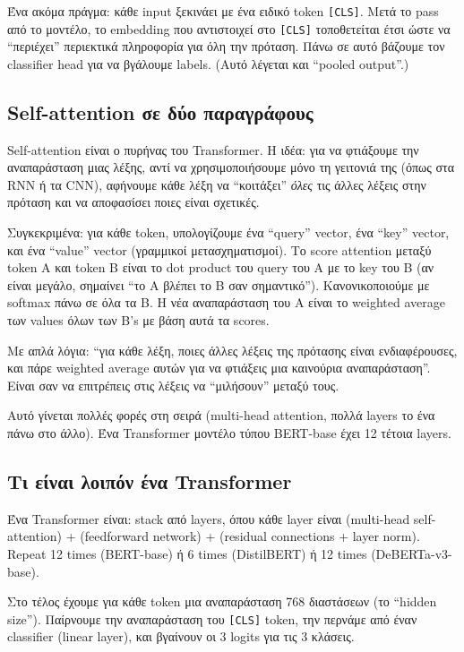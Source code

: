 \documentclass[12pt]{fphw}
\begin{document}
Ένα ακόμα πράγμα: κάθε input ξεκινάει με ένα ειδικό token \texttt{[CLS]}. Μετά το pass από το μοντέλο, το embedding που αντιστοιχεί στο \texttt{[CLS]} τοποθετείται έτσι ώστε να ``περιέχει'' περιεκτικά πληροφορία για όλη την πρόταση. Πάνω σε αυτό βάζουμε τον classifier head για να βγάλουμε labels. (Αυτό λέγεται και ``pooled output''.)

\subsection{Self-attention σε δύο παραγράφους}

Self-attention είναι ο πυρήνας του Transformer. Η ιδέα: για να φτιάξουμε την αναπαράσταση μιας λέξης, αντί να χρησιμοποιήσουμε μόνο τη γειτονιά της (όπως στα RNN ή τα CNN), αφήνουμε κάθε λέξη να ``κοιτάξει'' \emph{όλες} τις άλλες λέξεις στην πρόταση και να αποφασίσει ποιες είναι σχετικές.

Συγκεκριμένα: για κάθε token, υπολογίζουμε ένα ``query'' vector, ένα ``key'' vector, και ένα ``value'' vector (γραμμικοί μετασχηματισμοί). Το score attention μεταξύ token A και token B είναι το dot product του query του A με το key του B (αν είναι μεγάλο, σημαίνει ``το A βλέπει το B σαν σημαντικό''). Κανονικοποιούμε με softmax πάνω σε όλα τα Β. Η νέα αναπαράσταση του A είναι το weighted average των values όλων των B's με βάση αυτά τα scores.

Με απλά λόγια: ``για κάθε λέξη, ποιες άλλες λέξεις της πρότασης είναι ενδιαφέρουσες, και πάρε weighted average αυτών για να φτιάξεις μια καινούρια αναπαράσταση''. Είναι σαν να επιτρέπεις στις λέξεις να ``μιλήσουν'' μεταξύ τους.

Αυτό γίνεται πολλές φορές στη σειρά (multi-head attention, πολλά layers το ένα πάνω στο άλλο). Ένα Transformer μοντέλο τύπου BERT-base έχει 12 τέτοια layers.

\subsection{Τι είναι λοιπόν ένα Transformer}

Ένα Transformer είναι: stack από layers, όπου κάθε layer είναι (multi-head self-attention) + (feedforward network) + (residual connections + layer norm). Repeat 12 times (BERT-base) ή 6 times (DistilBERT) ή 12 times (DeBERTa-v3-base).

Στο τέλος έχουμε για κάθε token μια αναπαράσταση 768 διαστάσεων (το ``hidden size''). Παίρνουμε την αναπαράσταση του \texttt{[CLS]} token, την περνάμε από έναν classifier (linear layer), και βγαίνουν οι 3 logits για τις 3 κλάσεις.
\end{document}
